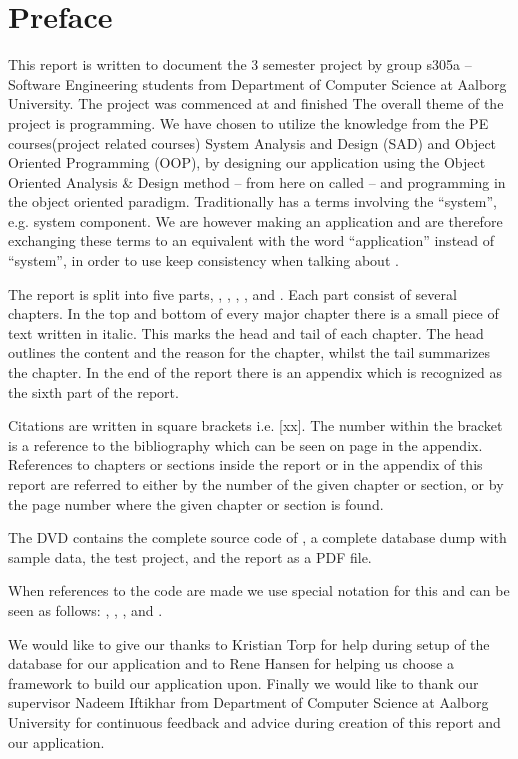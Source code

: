 \chapter*{Preface}
\label{chap:preface}
%
\emptyTop{}%
\vspace{-15mm}%
This report is written to document the 3\rd{} semester project by group s305a -- Software Engineering students from Department of Computer Science at Aalborg University. 
The project was commenced at  and finished 
The overall theme of the project is programming. 
We have chosen to utilize the knowledge from the PE courses(project related courses) System Analysis and Design (SAD) and Object Oriented Programming (OOP), by designing our application using the Object Oriented Analysis \& Design method -- from here on called \ooad[] -- and programming \hdesk[] in the object oriented paradigm.  
Traditionally \ooad[] has a terms involving the ``system'', e.g. system component.
We are however making an application and are therefore exchanging these terms to an equivalent with the word ``application'' instead of ``system'', in order to use keep consistency when talking about \hdesk[].

The report is split into five parts, , , , , and . Each part consist of several chapters. In the top and bottom of every major chapter there is a small piece of text written in italic. This marks the head and tail of each chapter. The head outlines the content and the reason for the chapter, whilst the tail summarizes the chapter.
In the end of the report there is an appendix which is recognized as the sixth part of the report.

Citations are written in square brackets i.e. [xx]. The number within the bracket is a reference to the bibliography which can be seen on page \pageref{chap:bib} in the appendix.
References to chapters or sections inside the report or in the appendix of this report are referred to either by the number of the given chapter or section, or by the page number where the given chapter or section is found.

The DVD contains the complete source code of \hdesk[], a complete database dump with sample data, the test project, and the report as a PDF file.  

When references to the code are made we use special notation for this and can be seen as follows: , , , and .

We would like to give our thanks to Kristian Torp for help during setup of the database for our application and to Rene Hansen for helping us choose a framework to build our application upon.
Finally we would like to thank our supervisor Nadeem Iftikhar from Department of Computer Science at Aalborg University for continuous feedback and advice during creation of this report and our application.